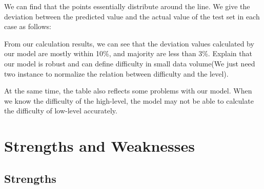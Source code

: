 \documentclass{mcmthesis}
\begin{document}
		We can find that the points essentially distribute around the line. We give the deviation between the predicted value and the actual value of the test set in each case as follows:
		
		\begin{table}[htbp]
			\center
			\caption{ Deviation of All Cases}
			
		\end{table}
	
		From our calculation results, we can see that the deviation values calculated by our model are mostly within 10\%, and majority are less than 3\%. Explain that our model is robust and can define difficulty in small data volume(We just need two instance to normalize the relation between difficulty and the level).
		
		At the same time, the table also reflects some problems with our model. When we know the difficulty of the high-level, the model may not be able to calculate the difficulty of low-level accurately.
		
		
		
		
		
		
		
		
	\section{Strengths and Weaknesses}
	
		\subsection{Strengths}
		
\end{document}
